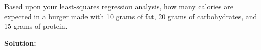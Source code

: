 Based upon your least-squares regression analysis, how many calories are expected in a burger made with 10 grams of fat, 20 grams of carbohydrates, and 15 grams of protein.

\nl \textbf{Solution: } 
